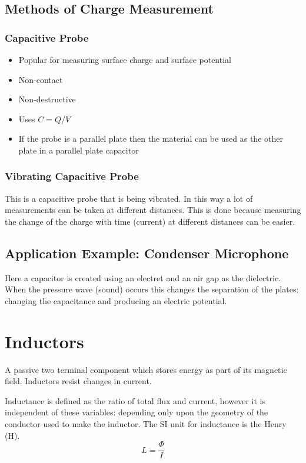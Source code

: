 \documentclass[11pt,a4paper]{report}
\begin{document}
\subsection{Methods of Charge Measurement}
\subsubsection{Capacitive Probe}
\begin{itemize}
	\item Popular for measuring surface charge and surface potential
	\item Non-contact
	\item Non-destructive
	\item Uses $C = Q/V$
	\item If the probe is a parallel plate then the material can be used as the other plate in a parallel plate capacitor
\end{itemize}

\subsubsection{Vibrating Capacitive Probe}
This is a capacitive probe that is being vibrated. In this way a lot of measurements can be taken at different distances. This is done because measuring the change of the charge with time (current) at different distances can be easier.

\subsection{Application Example: Condenser Microphone}
Here a capacitor is created using an electret and an air gap as the dielectric. When the pressure wave (sound) occurs this changes the separation of the plates: changing the capacitance and producing an electric potential. 

\section{Inductors}
A passive two terminal component which stores energy as part of its magnetic field. Inductors resist changes in current. 

Inductance is defined as the ratio of total flux and current, however it is independent of these variables: depending only upon the geometry of the conductor used to make the inductor. The SI unit for inductance is the Henry (H).
\begin{equation*}
	L = \frac{\Phi}{I}
\end{equation*}
\end{document}
